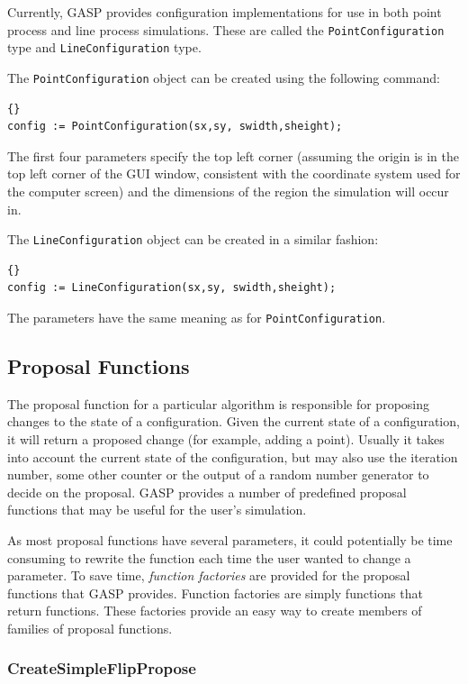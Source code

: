 Currently, GASP provides configuration implementations for use in both
point process and line process simulations.  These are called the
\texttt{Point\-Configuration} type and \texttt{Line\-Configuration}
type.

The \texttt{Point\-Configuration} object can be created using the
following command:
\begin{lstlisting}{}
config := PointConfiguration(sx,sy, swidth,sheight);
\end{lstlisting}

\noindent The first four parameters specify the top left corner
(assuming the origin is in the top left corner of the GUI window,
consistent with the coordinate system used for the computer screen)
and the dimensions of the region the simulation will occur in.

The \texttt{LineConfiguration} object can be created in a similar
fashion:
\begin{lstlisting}{}
config := LineConfiguration(sx,sy, swidth,sheight);
\end{lstlisting}

\noindent The parameters have the same meaning as for
\texttt{PointConfiguration}.

\subsection{Proposal Functions}

The proposal function for a particular algorithm is responsible for
proposing changes to the state of a configuration.  Given the current
state of a configuration, it will return a proposed change (for
example, adding a point).  Usually it takes into account the current
state of the configuration, but may also use the iteration number,
some other counter or the output of a random number generator to
decide on the proposal.  GASP provides a number of predefined proposal
functions that may be useful for the user's simulation.

As most proposal functions have several parameters, it could
potentially be time consuming to rewrite the function each time the
user wanted to change a parameter.  To save time, \emph{function
factories} are provided for the proposal functions that GASP provides.
Function factories are simply functions that return functions.  These
factories provide an easy way to create members of families of
proposal functions.

\subsubsection{CreateSimpleFlipPropose}

